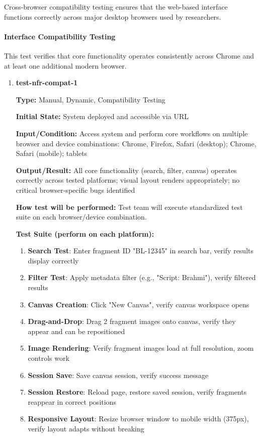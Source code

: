 \documentclass[12pt, titlepage]{article}
\begin{document}
Cross-browser compatibility testing ensures that the web-based interface functions correctly across major desktop browsers used by researchers.

\paragraph{Interface Compatibility Testing}

This test verifies that core functionality operates consistently across Chrome and at least one additional modern browser.

\begin{enumerate}

\item \textbf{test-nfr-compat-1}

\textbf{Type:} Manual, Dynamic, Compatibility Testing
					
\textbf{Initial State:} System deployed and accessible via URL
					
\textbf{Input/Condition:} Access system and perform core workflows on multiple browser and device combinations: Chrome, Firefox, Safari (desktop); Chrome, Safari (mobile); tablets
					
\textbf{Output/Result:} All core functionality (search, filter, canvas) operates correctly across tested platforms; visual layout renders appropriately; no critical browser-specific bugs identified
					
\textbf{How test will be performed:} Test team will execute standardized test suite on each browser/device combination.

\textbf{Test Suite (perform on each platform):}
\begin{enumerate}
\item \textbf{Search Test}: Enter fragment ID "BL-12345" in search bar, verify results display correctly
\item \textbf{Filter Test}: Apply metadata filter (e.g., "Script: Brahmi"), verify filtered results
\item \textbf{Canvas Creation}: Click "New Canvas", verify canvas workspace opens
\item \textbf{Drag-and-Drop}: Drag 2 fragment images onto canvas, verify they appear and can be repositioned
\item \textbf{Image Rendering}: Verify fragment images load at full resolution, zoom controls work
\item \textbf{Session Save}: Save canvas session, verify success message
\item \textbf{Session Restore}: Reload page, restore saved session, verify fragments reappear in correct positions
\item \textbf{Responsive Layout}: Resize browser window to mobile width (375px), verify layout adapts without breaking
\end{enumerate}


\end{enumerate}
\end{document}
